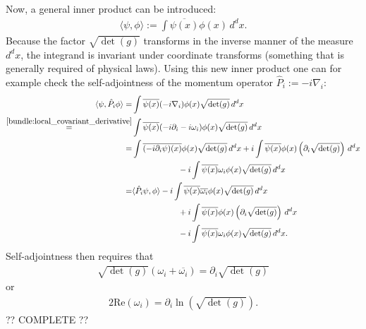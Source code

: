     Now, a general inner product can be introduced:
    \begin{gather}
        \langle\psi,\phi\rangle := \int\overline{\psi(x)}\phi(x)\,d^dx.
    \end{gather}
    Because the factor $\sqrt{\det(g)}$ transforms in the inverse manner of the measure $d^dx$, the integrand is invariant under coordinate transforms (something that is generally required of physical laws). Using this new inner product one can for example check the self-adjointness of the momentum operator $\hat{P}_i := -i\nabla_i$:
    \begin{align*}
        \langle\psi,\hat{P}_i\phi\rangle = &\int\overline{\psi(x)}(-i\nabla_i)\phi(x)\sqrt{\det(g)}\,d^dx\\
        \overset{\eqref{bundle:local_covariant_derivative}}{=} &\int\overline{\psi(x)}(-i\partial_i - i\omega_i)\phi(x)\sqrt{\det(g)}\,d^dx\\
        = &\int\overline{(-i\partial_i\psi)(x)}\phi(x)\sqrt{\det(g)}\,d^dx+i\int\overline{\psi(x)}\phi(x)\left(\partial_i\sqrt{\det(g)}\right)\,d^dx\\
            &\hspace{2cm} -i\int\overline{\psi(x)}\omega_i\phi(x)\sqrt{\det(g)}\,d^dx\\
        = &\langle\hat{P}_i\psi,\phi\rangle -i\int\overline{\psi(x)}\overline{\omega_i}\phi(x)\sqrt{\det(g)}\,d^dx\\
            &\hspace{2cm} + i\int\overline{\psi(x)}\phi(x)\left(\partial_i\sqrt{\det(g)}\right)\,d^dx\\
            &\hspace{2cm} -i\int\overline{\psi(x)}\omega_i\phi(x)\sqrt{\det(g)}\,d^dx.
    \end{align*}
    Self-adjointness then requires that
    \begin{gather}
        \sqrt{\det(g)}(\omega_i + \overline{\omega_i}) = \partial_i\sqrt{\det(g)}
    \end{gather}
    or
    \begin{gather}
        2\mathrm{Re}(\omega_i) = \partial_i\ln\left(\sqrt{\det(g)}\right).
    \end{gather}
    ?? COMPLETE ??

\section{}

